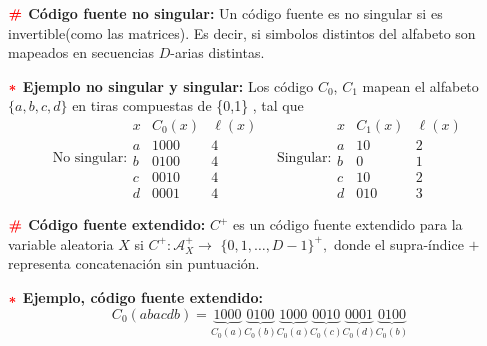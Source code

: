 \documentclass[%
 reprint,
 amsmath,amssymb,
 aps,
]{revtex4-1}
\begin{document}
\textbf{$\color{red}{\textbf{\#}}$ Código fuente no singular:} 
Un código fuente es no singular si es invertible(como las matrices). Es decir, si simbolos distintos del alfabeto son mapeados en secuencias $D$-arias distintas.

\textbf{$\textcolor{red}{\color{red}{\boldsymbol{*}}}$ Ejemplo no singular y singular:}
Los código $C_{0}$, $C_{1}$ mapean el alfabeto $\{a, b, c, d\}$ en tiras compuestas de \{0,1\} , tal que
$$
\text{No singular:}
\begin{array}{c|c|c}
x & C_{0}(x) & \ell(x) \\
\hline a & 1000 & 4 \\
b & 0100 & 4 \\
c & 0010 & 4 \\
d & 0001 & 4
\end{array}\quad 
\text{Singular:}
\begin{array}{c|c|c}
x & C_{1}(x) & \ell(x) \\
\hline a & 10 & 2 \\
b & 0 & 1 \\
c & 10 & 2 \\
d & 010 & 3
\end{array}
$$

\textbf{$\color{red}{\textbf{\#}}$ Código fuente extendido:} 
$C^{+}$ es un código fuente extendido para la variable aleatoria $X$ si $C^{+}: \mathcal{A}_{X}^{+} \rightarrow$ $\{0,1, \ldots, D-1\}^{+},$ donde el supra-índice $+$ representa concatenación sin puntuación.

\textbf{$\textcolor{red}{\color{red}{\boldsymbol{*}}}$ Ejemplo, código fuente extendido:} 
$$
C_{0}(a b a c d b)=\underbrace{1000}_{C_{0}(a)} \underbrace{0100}_{C_{0}(b)} \underbrace{1000}_{C_{0}(a)} \underbrace{0010}_{C_{0}(c)} \underbrace{0001}_{C_{0}(d)} \underbrace{0100}_{C_{0}(b)}
$$
\end{document}

